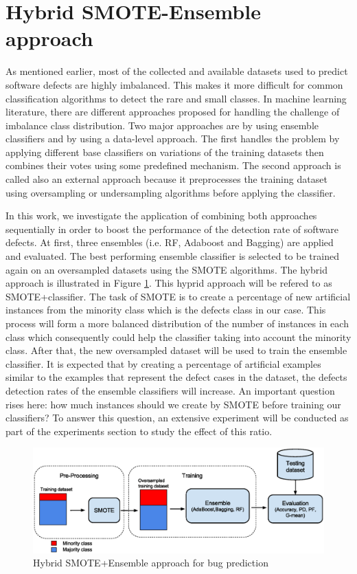 \documentclass[runningheads,a4paper]{llncs}
\begin{document}
\section{Hybrid SMOTE-Ensemble approach}
\label{SMOTE-Ensemble}

As mentioned earlier, most of the collected and available datasets used to predict software defects are highly imbalanced. This makes it more difficult for common classification algorithms to detect the rare and small classes. In machine learning literature, there are different approaches proposed for handling the challenge of imbalance class distribution. Two major approaches are by using ensemble classifiers and by using a data-level approach. The first handles the problem by applying different base classifiers on variations of the training datasets then combines their votes using some predefined mechanism. The second approach is called also an external approach because it preprocesses the training dataset using oversampling or undersampling algorithms before applying the classifier. 

In this work, we investigate the application of combining both approaches sequentially in order to boost the performance of the detection rate of software defects. At first, three ensembles (i.e. RF, Adaboost and Bagging) are applied and evaluated. The best performing ensemble classifier is selected to be trained again on an oversampled datasets using the SMOTE algorithms. The hybrid approach is illustrated in Figure \ref{fig:fig1}. This hyprid approach will be refered to as SMOTE+classifier. The task of SMOTE is to create a percentage of new artificial instances from the minority class which is the defects class in our case. This process will form a more balanced distribution of the number of instances in each class which consequently could help the classifier taking into account the minority class. After that, the new oversampled dataset will be used to train the ensemble classifier. It is expected that by creating a percentage of artificial examples similar to the examples that represent the defect cases in the dataset, the defects detection rates of the ensemble classifiers will increase. An important question rises here: how much instances should we create by SMOTE before training our classifiers? To answer this question, an extensive experiment will be conducted as part of the experiments section to study the effect of this ratio.
 

\begin{figure}[H]
\centering
\includegraphics[scale=0.40]{Framework.eps}
\caption{Hybrid SMOTE+Ensemble approach for bug prediction}
\label{fig:fig1}
\end{figure}
\end{document}
